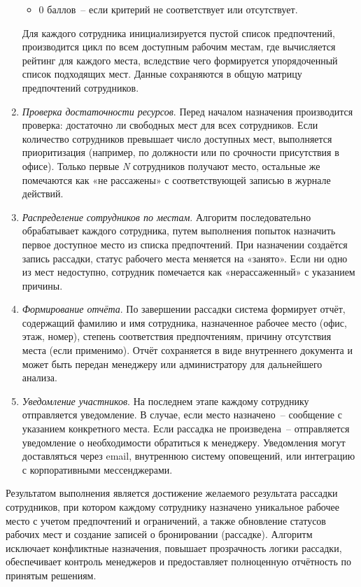 \begin{enumerate}
\begin{itemize}
        \item 0 баллов~-- если критерий не соответствует или отсутствует.
    \end{itemize}
    Для каждого сотрудника инициализируется пустой список предпочтений, производится цикл по всем доступным рабочим местам, где вычисляется рейтинг для каждого места, вследствие чего формируется упорядоченный список подходящих мест. Данные сохраняются в общую матрицу предпочтений сотрудников.
    \item \textit{Проверка достаточности ресурсов}. Перед началом назначения производится проверка: достаточно ли свободных мест для всех сотрудников. Если количество сотрудников превышает число доступных мест, выполняется приоритизация (например, по должности или по срочности присутствия в офисе). Только первые \textit{N} сотрудников получают место, остальные же помечаются как «не рассажены» с соответствующей записью в журнале действий.
    \item \textit{Распределение сотрудников по местам}. Алгоритм последовательно обрабатывает каждого сотрудника, путем выполнения попыток назначить первое доступное место из списка предпочтений. При назначении создаётся запись рассадки, статус рабочего места меняется на «занято». Если ни одно из мест недоступно, сотрудник помечается как «нерассаженный» с указанием причины.
    \item \textit{Формирование отчёта}. По завершении рассадки система формирует отчёт, содержащий фамилию и имя сотрудника, назначенное рабочее место (офис, этаж, номер), степень соответствия предпочтениям, причину отсутствия места (если применимо). Отчёт сохраняется в виде внутреннего документа и может быть передан менеджеру или администратору для дальнейшего анализа.
    \item \textit{Уведомление участников}. На последнем этапе каждому сотруднику отправляется уведомление. В случае, если место назначено~-- сообщение с указанием конкретного места. Если рассадка не произведена~-- отправляется уведомление о необходимости обратиться к менеджеру. Уведомления могут доставляться через email, внутреннюю систему оповещений, или интеграцию с корпоративными мессенджерами.
\end{enumerate}

Результатом выполнения является достижение желаемого результата рассадки сотрудников, при котором каждому сотруднику назначено уникальное рабочее место с учетом предпочтений и ограничений, а также обновление статусов рабочих мест и создание записей о бронировании (рассадке). Алгоритм исключает конфликтные назначения, повышает прозрачность логики рассадки, обеспечивает контроль менеджеров и предоставляет полноценную отчётность по принятым решениям.

